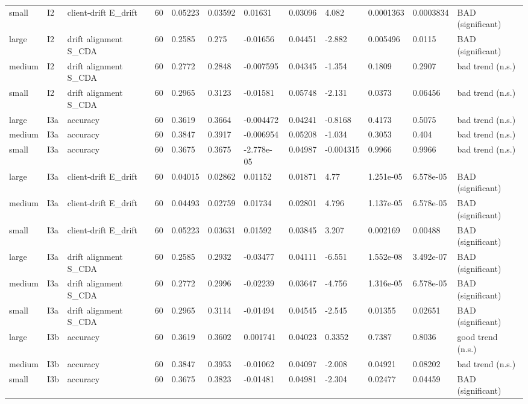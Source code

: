 \begin{table}[t]
\begin{tabular}{llllllllllll}
small & I2 & client-drift E\_drift & 60 & 0.05223 & 0.03592 & 0.01631 & 0.03096 & 4.082 & 0.0001363 & 0.0003834 & BAD (significant) \\
large & I2 & drift alignment S\_CDA & 60 & 0.2585 & 0.275 & -0.01656 & 0.04451 & -2.882 & 0.005496 & 0.0115 & BAD (significant) \\
medium & I2 & drift alignment S\_CDA & 60 & 0.2772 & 0.2848 & -0.007595 & 0.04345 & -1.354 & 0.1809 & 0.2907 & bad trend (n.s.) \\
small & I2 & drift alignment S\_CDA & 60 & 0.2965 & 0.3123 & -0.01581 & 0.05748 & -2.131 & 0.0373 & 0.06456 & bad trend (n.s.) \\
large & I3a & accuracy & 60 & 0.3619 & 0.3664 & -0.004472 & 0.04241 & -0.8168 & 0.4173 & 0.5075 & bad trend (n.s.) \\
medium & I3a & accuracy & 60 & 0.3847 & 0.3917 & -0.006954 & 0.05208 & -1.034 & 0.3053 & 0.404 & bad trend (n.s.) \\
small & I3a & accuracy & 60 & 0.3675 & 0.3675 & -2.778e-05 & 0.04987 & -0.004315 & 0.9966 & 0.9966 & bad trend (n.s.) \\
large & I3a & client-drift E\_drift & 60 & 0.04015 & 0.02862 & 0.01152 & 0.01871 & 4.77 & 1.251e-05 & 6.578e-05 & BAD (significant) \\
medium & I3a & client-drift E\_drift & 60 & 0.04493 & 0.02759 & 0.01734 & 0.02801 & 4.796 & 1.137e-05 & 6.578e-05 & BAD (significant) \\
small & I3a & client-drift E\_drift & 60 & 0.05223 & 0.03631 & 0.01592 & 0.03845 & 3.207 & 0.002169 & 0.00488 & BAD (significant) \\
large & I3a & drift alignment S\_CDA & 60 & 0.2585 & 0.2932 & -0.03477 & 0.04111 & -6.551 & 1.552e-08 & 3.492e-07 & BAD (significant) \\
medium & I3a & drift alignment S\_CDA & 60 & 0.2772 & 0.2996 & -0.02239 & 0.03647 & -4.756 & 1.316e-05 & 6.578e-05 & BAD (significant) \\
small & I3a & drift alignment S\_CDA & 60 & 0.2965 & 0.3114 & -0.01494 & 0.04545 & -2.545 & 0.01355 & 0.02651 & BAD (significant) \\
large & I3b & accuracy & 60 & 0.3619 & 0.3602 & 0.001741 & 0.04023 & 0.3352 & 0.7387 & 0.8036 & good trend (n.s.) \\
medium & I3b & accuracy & 60 & 0.3847 & 0.3953 & -0.01062 & 0.04097 & -2.008 & 0.04921 & 0.08202 & bad trend (n.s.) \\
small & I3b & accuracy & 60 & 0.3675 & 0.3823 & -0.01481 & 0.04981 & -2.304 & 0.02477 & 0.04459 & BAD (significant) \\

\end{tabular}
\end{table}
